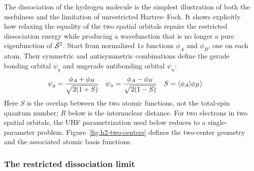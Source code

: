 \documentclass[11pt,a4paper,titlepage]{article}
\numberwithin{equation}{section}
\newcommand{\chS}{\Hat{\mathcal{S}}}
\begin{document}
The dissociation of the hydrogen molecule is the simplest illustration of
both the usefulness and the limitation of unrestricted Hartree--Fock. It
shows explicitly how relaxing the equality of the two spatial orbitals repairs
the restricted dissociation energy while producing a wavefunction that is no
longer a pure eigenfunction of $\chS^2$.
Start from normalized $1s$ functions $\phi_A$ and $\phi_B$, one on each atom.
Their symmetric and antisymmetric combinations define the gerade bonding
orbital $\psi_g$ and ungerade antibonding orbital $\psi_u$:
\begin{align}
  \psi_g&=\frac{\phi_A+\phi_B}{\sqrt{2(1+S)}}
  &
  \psi_u&=\frac{\phi_A-\phi_B}{\sqrt{2(1-S)}}
  &
  S&=\braket{\phi_A}{\phi_B}
\end{align}
Here $S$ is the overlap between the two atomic functions, not the total-spin
quantum number; $R$ below is the internuclear distance. For two electrons in
two spatial orbitals, the UHF parametrization used below reduces to a
single-parameter problem.
Figure~\ref{fig:h2-two-centers} defines the two-center geometry and
the associated atomic basis functions.
\begin{center}
\label{fig:h2-two-centers}
\end{center}

\subsubsection{The restricted dissociation limit}
\end{document}

